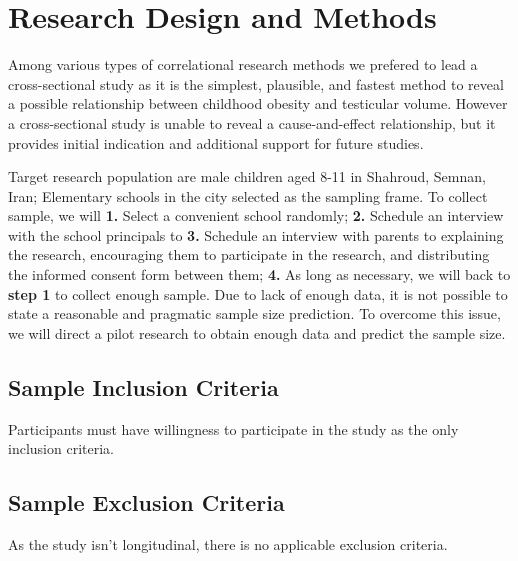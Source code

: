 \documentclass[11pt]{article}
\begin{document}
\section{Research Design and Methods}
\label{sec:org54930dd}
Among various types of correlational research methods we prefered to lead a cross-sectional study as it is the simplest, plausible, and fastest method to reveal a possible relationship between childhood obesity and testicular volume.
However a cross-sectional study is unable to reveal a cause-and-effect relationship, but it provides initial indication and additional support for future studies.

Target research population are male children aged 8-11 in Shahroud, Semnan, Iran;
Elementary schools in the city selected as the sampling frame.
To collect sample, we will
\textbf{1.} Select a convenient school randomly;
\textbf{2.} Schedule an interview with the school principals to
\textbf{3.} Schedule an interview with parents to explaining the research, encouraging them to participate in the research, and distributing the informed consent form between them;
\textbf{4.} As long as necessary, we will back to \textbf{step 1} to collect enough sample.
Due to lack of enough data, it is not possible to state a reasonable and pragmatic sample size prediction.
To overcome this issue, we will direct a pilot research to obtain enough data and predict the sample size.

\subsection{Sample Inclusion Criteria}
\label{sec:orgc884046}
Participants must have willingness to participate in the study as the only inclusion criteria.

\subsection{Sample Exclusion Criteria}
\label{sec:org926d2b0}
As the study isn't longitudinal, there is no applicable exclusion criteria.
\end{document}

